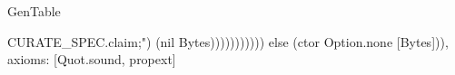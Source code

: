 \begin{lexlean}{GenTable}
\begin{semanticmodule}
{CURATE_SPEC.claim;\n") (nil Bytes))))))))))) else (ctor Option.none [Bytes])),
  axioms: [Quot.sound, propext]
}
\end{semanticmodule}
\end{lexlean}

